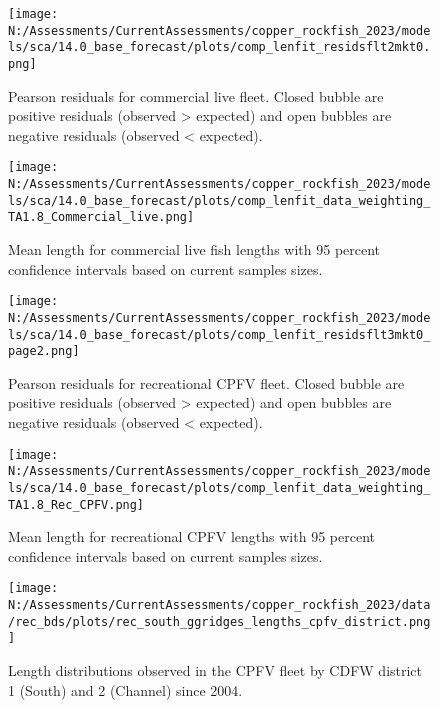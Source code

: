 \documentclass[11pt,
  english,
  letterpaper,
]{article}
\begin{document}
\pagebreak

\begin{figure}
\centering
\texttt{[image: N:/Assessments/CurrentAssessments/copper\_rockfish\_2023/models/sca/14.0\_base\_forecast/plots/comp\_lenfit\_residsflt2mkt0.png]}
\caption{Pearson residuals for commercial live fleet. Closed bubble are positive residuals (observed \textgreater{} expected) and open bubbles are negative residuals (observed \textless{} expected).\label{fig:com-live-pearson}}
\end{figure}

\pagebreak

\begin{figure}
\centering
\texttt{[image: N:/Assessments/CurrentAssessments/copper\_rockfish\_2023/models/sca/14.0\_base\_forecast/plots/comp\_lenfit\_data\_weighting\_TA1.8\_Commercial\_live.png]}
\caption{Mean length for commercial live fish lengths with 95 percent confidence intervals based on current samples sizes.\label{fig:com-live-mean-len-fit}}
\end{figure}

\pagebreak

\begin{figure}
\centering
\texttt{[image: N:/Assessments/CurrentAssessments/copper\_rockfish\_2023/models/sca/14.0\_base\_forecast/plots/comp\_lenfit\_residsflt3mkt0\_page2.png]}
\caption{Pearson residuals for recreational CPFV fleet. Closed bubble are positive residuals (observed \textgreater{} expected) and open bubbles are negative residuals (observed \textless{} expected).\label{fig:rec-cpfv-pearson}}
\end{figure}

\pagebreak

\begin{figure}
\centering
\texttt{[image: N:/Assessments/CurrentAssessments/copper\_rockfish\_2023/models/sca/14.0\_base\_forecast/plots/comp\_lenfit\_data\_weighting\_TA1.8\_Rec\_CPFV.png]}
\caption{Mean length for recreational CPFV lengths with 95 percent confidence intervals based on current samples sizes.\label{fig:rec-cpfv-mean-len-fit}}
\end{figure}

\pagebreak

\begin{figure}
\centering
\texttt{[image: N:/Assessments/CurrentAssessments/copper\_rockfish\_2023/data/rec\_bds/plots/rec\_south\_ggridges\_lengths\_cpfv\_district.png]}
\caption{Length distributions observed in the CPFV fleet by CDFW district 1 (South) and 2 (Channel) since 2004.\label{fig:rec-cpfv-dist}}
\end{figure}
\end{document}
